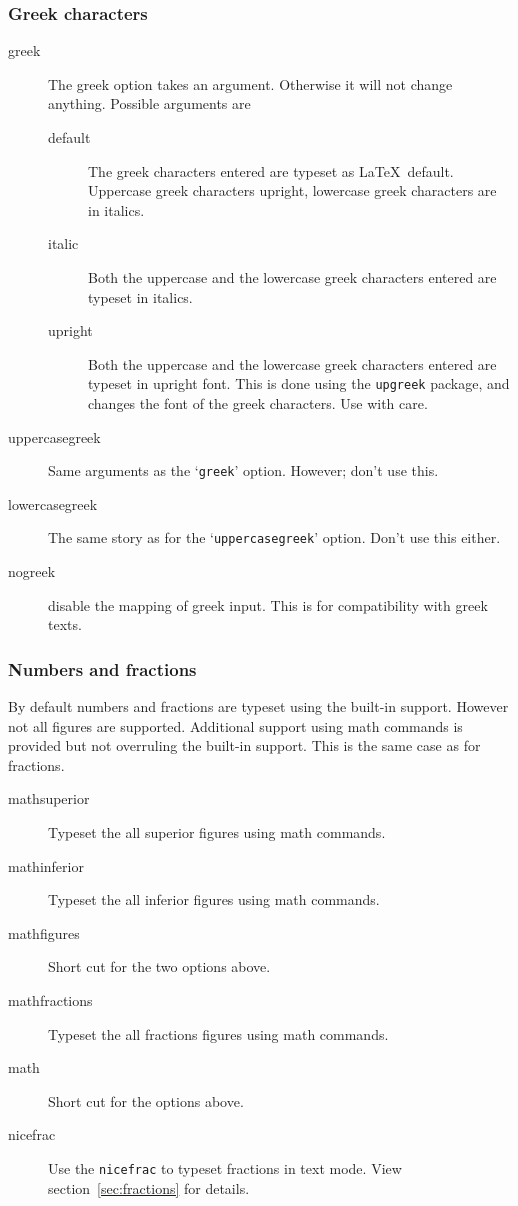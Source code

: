 \documentclass[a4paper,british,parskip=half,11pt,fleqn]{scrartcl}
\begin{document}
\subsubsection{Greek characters}
\label{sec:greek-characters-1}

\begin{description}
\item[greek] The greek option takes an argument. Otherwise it will not
  change anything. Possible arguments are
  \begin{description}
  \item[default] The greek characters entered are typeset as \LaTeX\
    default. Uppercase greek characters upright, lowercase greek
    characters are in italics.
  \item[italic] Both the uppercase and the lowercase greek characters
    entered are typeset in italics.
  \item[upright] Both the uppercase and the lowercase greek characters
    entered are typeset in upright font. This is done using the
    \texttt{upgreek} package, and changes the font of the greek
    characters. Use with care.
  \end{description}
\item[uppercasegreek] Same arguments as the `\texttt{greek}' option.
  However; don't use this.
\item[lowercasegreek] The same story as for the
  `\texttt{uppercasegreek}' option. Don't use this either.
\item[nogreek] disable the mapping of greek input. This is for
  compatibility with greek texts.

\end{description}

\subsubsection{Numbers and fractions}
\label{sec:super-infer-numb}

By default numbers and fractions are typeset using the built-in
support. However not all figures are supported. Additional support
using math commands is provided but not overruling the built-in
support. This is the same case as for fractions.

\begin{description}
\item[mathsuperior] Typeset the all superior figures using math
  commands.
\item[mathinferior] Typeset the all inferior figures using math
  commands.
\item[mathfigures] Short cut for the two options above.
\item[mathfractions] Typeset the all fractions figures using math
  commands.
\item[math] Short cut for the options above.
\item[nicefrac] Use the \texttt{nicefrac} to typeset fractions in text
  mode. View section~\ref{sec:fractions} for details.
\end{description}
\end{document}
